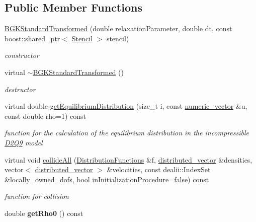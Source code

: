 \subsection*{Public Member Functions}
\begin{DoxyCompactItemize}
\item 
\hypertarget{classnatrium_1_1BGKStandardTransformed_ae53d86d6ae640cc598b152538e347737}{
\hyperlink{classnatrium_1_1BGKStandardTransformed_ae53d86d6ae640cc598b152538e347737}{BGKStandardTransformed} (double relaxationParameter, double dt, const boost::shared\_\-ptr$<$ \hyperlink{classnatrium_1_1Stencil}{Stencil} $>$ stencil)}
\label{classnatrium_1_1BGKStandardTransformed_ae53d86d6ae640cc598b152538e347737}

\begin{DoxyCompactList}\small\item\em constructor \item\end{DoxyCompactList}\item 
virtual \hyperlink{classnatrium_1_1BGKStandardTransformed_a07dc7f5ccaf1abaa725a7b62a2b79ac4}{$\sim$BGKStandardTransformed} ()
\begin{DoxyCompactList}\small\item\em destructor \item\end{DoxyCompactList}\item 
virtual double \hyperlink{classnatrium_1_1BGKStandardTransformed_a870465cc026f92c8ffba899af6f95634}{getEquilibriumDistribution} (size\_\-t i, const \hyperlink{namespacenatrium_a67c39077adc6634f8fa3762b8eef24c4}{numeric\_\-vector} \&u, const double rho=1) const 
\begin{DoxyCompactList}\small\item\em function for the calculation of the equilibrium distribution in the incompressible \hyperlink{classnatrium_1_1D2Q9}{D2Q9} model \item\end{DoxyCompactList}\item 
virtual void \hyperlink{classnatrium_1_1BGKStandardTransformed_aaa2e752c6aa2294f1ebeb9d326ba9eb8}{collideAll} (\hyperlink{classnatrium_1_1DistributionFunctions}{DistributionFunctions} \&f, \hyperlink{namespacenatrium_a903d2b92917f582f2ff05f52160ab811}{distributed\_\-vector} \&densities, vector$<$ \hyperlink{namespacenatrium_a903d2b92917f582f2ff05f52160ab811}{distributed\_\-vector} $>$ \&velocities, const dealii::IndexSet \&locally\_\-owned\_\-dofs, bool inInitializationProcedure=false) const 
\begin{DoxyCompactList}\small\item\em function for collision \item\end{DoxyCompactList}\item 
\hypertarget{classnatrium_1_1BGKStandardTransformed_a883401ad796f196bcc47456b31159eae}{
double {\bfseries getRho0} () const }
\label{classnatrium_1_1BGKStandardTransformed_a883401ad796f196bcc47456b31159eae}


\end{DoxyCompactItemize}
